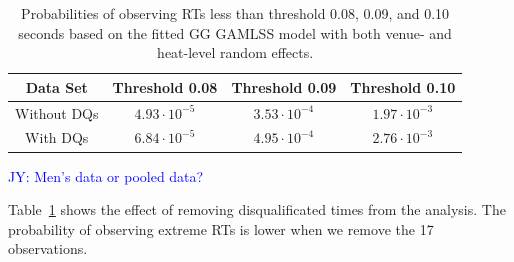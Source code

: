 \documentclass[12pt, letterpaper]{article}
\newcommand{\jy}[1]{\textcolor{blue}{JY: #1}}
\begin{document}
\begin{table}
  \centering
  \caption{Probabilities of observing RTs less than threshold 0.08,
  0.09, and 0.10 seconds based on the
    fitted GG GAMLSS model with both venue- and heat-level
random effects.}
  \begin{tabular}{c c c c}
   \toprule
   Data Set & Threshold 0.08 & Threshold 0.09 & Threshold 0.10  \\
   \midrule
   Without DQs & $4.93\cdot10^{-5}$ & $3.53\cdot10^{-4}$ &  $1.97\cdot10^{-3}$  \\
   With DQs & $6.84\cdot10^{-5}$ & $4.95\cdot10^{-4}$ & $2.76\cdot10^{-3}$ \\
   \bottomrule
  \end{tabular}
  \label{tab:DQSim_probability}
\end{table}

\jy{Men's data or pooled data?}

Table~\ref{tab:DQSim_probability} shows the effect of removing disqualificated
times from the analysis.  The probability of observing extreme RTs is lower when
we remove the 17 observations.



\end{document}
